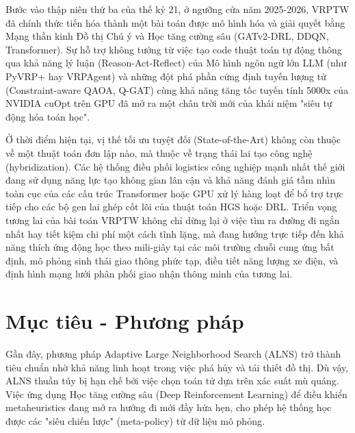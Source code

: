 \documentclass[13pt, a4paper]{extarticle} %
\begin{document}
Bước vào thập niên thứ ba của thế kỷ 21, ở ngưỡng cửa năm 2025-2026, VRPTW đã chính thức tiến hóa thành một bài toán được mô hình hóa và giải quyết bằng Mạng thần kinh Đồ thị Chú ý và Học tăng cường sâu (GATv2-DRL, DDQN, Transformer). Sự hỗ trợ không tưởng từ việc tạo code thuật toán tự động thông qua khả năng lý luận (Reason-Act-Reflect) của Mô hình ngôn ngữ lớn LLM (như PyVRP+ hay VRPAgent) và những đột phá phần cứng định tuyến lượng tử (Constraint-aware QAOA, Q-GAT) cùng khả năng tăng tốc tuyến tính 5000x của NVIDIA cuOpt trên GPU đã mở ra một chân trời mới của khái niệm "siêu tự động hóa toán học".

Ở thời điểm hiện tại, vị thế tối ưu tuyệt đối (State-of-the-Art) không còn thuộc về một thuật toán đơn lập nào, mà thuộc về trạng thái lai tạo công nghệ (hybridization). Các hệ thống điều phối logistics công nghiệp mạnh nhất thế giới đang sử dụng năng lực tạo không gian lân cận và khả năng đánh giá tầm nhìn toàn cục của các cấu trúc Transformer hoặc GPU xử lý hàng loạt để bổ trợ trực tiếp cho các bộ gen lai ghép cốt lõi của thuật toán HGS hoặc DRL. Triển vọng tương lai của bài toán VRPTW không chỉ dừng lại ở việc tìm ra đường đi ngắn nhất hay tiết kiệm chi phí một cách tĩnh lặng, mà đang hướng trực tiếp đến khả năng thích ứng động học theo mili-giây tại các môi trường chuỗi cung ứng bất định, mô phỏng sinh thái giao thông phức tạp, điều tiết năng lượng xe điện, và định hình mạng lưới phân phối giao nhận thông minh của tương lai.











\newpage




        
\section{Mục tiêu - Phương pháp}
        
Gần đây, phương pháp Adaptive Large Neighborhood Search (ALNS) trở thành tiêu chuẩn nhờ khả năng linh hoạt trong việc phá hủy và tái thiết đồ thị. Dù vậy, ALNS thuần túy bị hạn chế bởi việc chọn toán tử dựa trên xác suất mù quáng. Việc ứng dụng Học tăng cường sâu (Deep Reinforcement Learning) để điều khiển metaheuristics \citep{Author2023} đang mở ra hướng đi mới đầy hứa hẹn, cho phép hệ thống học được các "siêu chiến lược" (meta-policy) từ dữ liệu mô phỏng.
\end{document}
